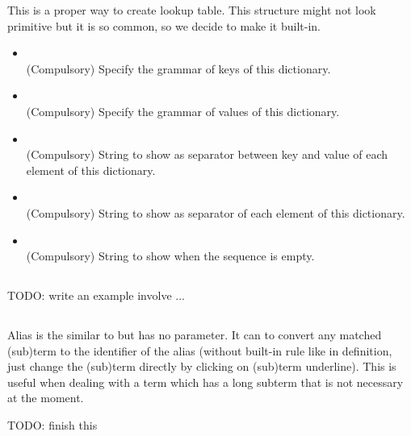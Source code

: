 \documentclass[master.tex]{subfiles}
\begin{document}
This is a proper way to create lookup table. This structure might not look primitive but it is so common, so we decide to make it built-in.

\begin{itemize}
    \item \kKeyGrammar {} \\
    (Compulsory) Specify the grammar of keys of this dictionary.
    \item \kValueGrammar {} \\
    (Compulsory) Specify the grammar of values of this dictionary.
    \item \kSeparator {} \\
    (Compulsory) String to show as separator between key and value of each element of this dictionary.
    \item \kDelimiter {} \\
    (Compulsory) String to show as separator of each element of this dictionary.
    \item \kWhenEmpty {} \\
    (Compulsory) String to show when the sequence is empty.
\end{itemize}

\subsection{\kDefinition {}}
TODO: write an example involve \kLet ... \kBe

\subsection{\kAlias {}}
Alias is the similar to \kDefinition but has no parameter. It can to convert any matched (sub)term to the identifier of the alias (without built-in rule like in definition, just change the (sub)term directly by clicking on (sub)term underline). This is useful when dealing with a term which has a long subterm that is not necessary at the moment.

TODO: finish this
\end{document}

